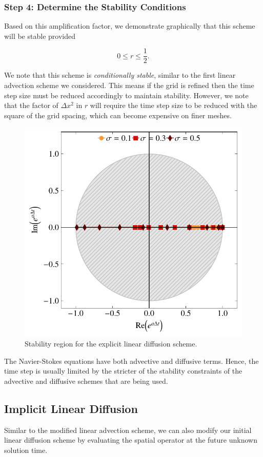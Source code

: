 \subsubsection{Step 4: Determine the Stability Conditions}
Based on this amplification factor, we demonstrate graphically that this scheme will be stable provided
\begin{eqBox}
\begin{equation}
	0 \leq r \leq \frac{1}{2}.
\end{equation}
\end{eqBox}
We note that this scheme is {\it conditionally stable}, similar to the first linear advection scheme we considered. This means if the grid is refined then the time step size must be reduced accordingly to maintain stability. However, we note that the factor of $\Delta x^2$ in $r$ will require the time step size to be reduced with the square of the grid spacing, which can become expensive on finer meshes.

\begin{figure}[htbp]
	\centering
	\includegraphics[width=0.6\linewidth]{Pictures/ch12_explicit_diffusion}
	\caption{Stability region for the explicit linear diffusion scheme.}
	\label{fig:explicit_diffusion}
\end{figure}

\begin{remark}
The Navier-Stokes equations have both advective and diffusive terms. Hence, the time step is usually limited by the stricter of the stability constraints of the advective and diffusive schemes that are being used.
\end{remark}

\subsection{Implicit Linear Diffusion}
Similar to the modified linear advection scheme, we can also modify our initial linear diffusion scheme by evaluating the spatial operator at the future unknown solution time.

